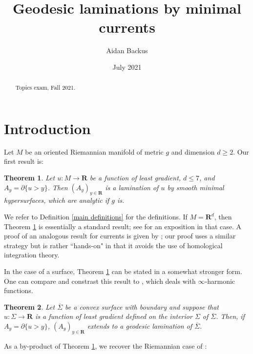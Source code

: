 \documentclass[reqno,12pt,letterpaper]{amsart}
\title[Geodesic laminations by minimal currents]{Geodesic laminations by minimal currents}
\author{Aidan Backus}
\date{July 2021}
\newcommand{\RR}{\mathbf{R}}
\newtheorem{theorem}{Theorem}[section]
\theoremstyle{definition}
\numberwithin{equation}{section}
\begin{document}
\begin{abstract}
Topics exam, Fall 2021.
\end{abstract}

\maketitle


\tableofcontents

\section{Introduction}
Let $M$ be an oriented Riemannian manifold of metric $g$ and dimension $d \geq 2$.
Our first result is:

\begin{theorem}\label{main thm}
Let $u: M \to \RR$ be a function of least gradient, $d \leq 7$, and $A_y = \partial \{u > y\}$.
Then $(A_y)_{y \in \RR}$ is a lamination of $u$ by smooth minimal hypersurfaces, which are analytic if $g$ is.
\end{theorem}

We refer to Definition \ref{main definitions} for the definitions.
If $M = \RR^d$, then Theorem \ref{main thm} is essentially a standard result; see \cite[Proposition 3.4]{górny2017planar} for an exposition in that case.
A proof of an analogous result for currents is given by \cite[\S5.3]{federer2014geometric}; our proof uses a similar strategy but is rather ``hands-on" in that it avoids the use of homological integration theory.

In the case of a surface, Theorem \ref{main thm} can be stated in a somewhat stronger form.
One can compare and constrast this result to \cite[Theorem 5.2]{daskalopoulos2020transverse}, which deals with $\infty$-harmonic functions.

\begin{theorem}\label{main crly}
Let $\overline \Sigma$ be a convex surface with boundary and suppose that $u: \Sigma \to \RR$ is a function of least gradient defined on the interior $\Sigma$ of $\overline \Sigma$.
Then, if $A_y = \partial \{u > y\}$, $(A_y)_{y \in \RR}$ extends to a geodesic lamination of $\overline \Sigma$.
\end{theorem}

As a by-product of Theorem \ref{main thm}, we recover the Riemannian case of \cite[Theorem 5.3.20]{federer2014geometric}:
\end{document}
